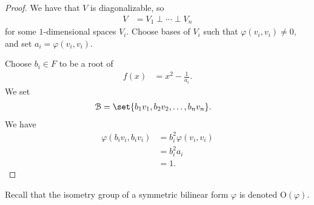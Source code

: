 \documentclass[10pt]{mypackage}
\begin{document}
  \begin{proof}
    We have that $V$ is diagonalizable, so
    \begin{align*}
      V &= V_1\perp\cdots\perp V_n
    \end{align*}
    for some $1$-dimensional spaces $V_i$. Choose bases of $V_i$ such that $\varphi\left(v_i,v_i\right)\neq 0$, and set $a_i = \varphi\left(v_i,v_i\right)$.\newline

    Choose $b_i\in F$ to be a root of
    \begin{align*}
      f(x) &= x^2 - \frac{1}{a_i}.
    \end{align*}
    We set
    \begin{align*}
      \mathcal{B} &= \set{b_1v_1,b_2v_2,\dots,b_nv_n}.
    \end{align*}
    We have
    \begin{align*}
      \varphi\left(b_iv_i,b_iv_i\right) &= b_i^{2}\varphi\left(v_i,v_i\right)\\
                                        &= b_i^2a_i\\
                                        &= 1.
    \end{align*}
  \end{proof}
  Recall that the isometry group of a symmetric bilinear form $\varphi$ is denoted $\text{O}\left(\varphi\right)$.\newline
\end{document}
